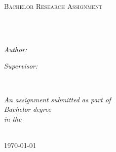 \documentclass[
11pt, %
english,
singlespacing, %
headsepline, %
]{BachelorAssignment} %
\author{Klio Fragkedaki} %
\begin{document}
\frontmatter %

\pagestyle{plain} %


\begin{titlepage}
\begin{center}

\vspace*{.06\textheight}
{\scshape\LARGE \univname\par}\vspace{1.5cm}
\textsc{\Large Bachelor Research Assignment}\\[0.5cm]

\HRule \\[0.4cm]
{\huge \bfseries \ttitle\par}\vspace{0.4cm}
\HRule \\[1.5cm]
 
\begin{minipage}[t]{0.4\textwidth}
\begin{flushleft} \large
\emph{Author:}\\
{\authorname} 
\end{flushleft}
\end{minipage}
\begin{minipage}[t]{0.4\textwidth}
\begin{flushright} \large
\emph{Supervisor:} \\
{\supname} 
\end{flushright}
\end{minipage}\\[3cm]
 
\vfill

\large \textit{An assignment submitted as part of\\ Bachelor degree}\\[0.3cm]
\textit{in the}\\[0.4cm]
\deptname\\[2cm]
 
\vfill
\vspace{5cm}

{\large \today}\\[4cm] %
 
\end{center}
\end{titlepage}
\end{document}
